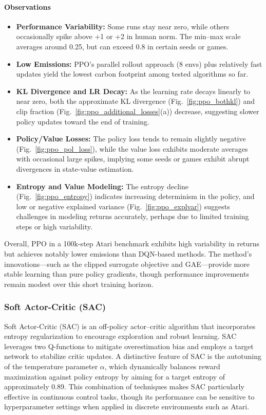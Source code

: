 \paragraph{Observations}
\begin{itemize}
	\item \textbf{Performance Variability:} 
	Some runs stay near zero, while others occasionally spike above +1 or +2 in human norm. 
	The min--max scale averages around 0.25, but can exceed 0.8 in certain seeds or games.
	\item \textbf{Low Emissions:} 
	PPO's parallel rollout approach (8 envs) plus relatively fast updates 
	yield the lowest carbon footprint among tested algorithms so far.
	\item \textbf{KL Divergence and LR Decay:} As the learning rate decays linearly to near zero, both the approximate KL divergence (Fig.~\ref{fig:ppo_bothkl}) and clip fraction (Fig.~\ref{fig:ppo_additional_losses}(a)) decrease, suggesting slower policy updates toward the end of training.
	\item \textbf{Policy/Value Losses:} The policy loss tends to remain slightly negative (Fig.~\ref{fig:ppo_pol_loss}), while the value loss exhibits moderate averages with occasional large spikes, implying some seeds or games exhibit abrupt divergences in state-value estimation.
	\item \textbf{Entropy and Value Modeling:} The entropy decline (Fig.~\ref{fig:ppo_entropy}) indicates increasing determinism in the policy, and low or negative explained variance (Fig.~\ref{fig:ppo_explvar}) suggests challenges in modeling returns accurately, perhaps due to limited training steps or high variability.
\end{itemize}

Overall, PPO in a 100k-step Atari benchmark exhibits high variability in returns but achieves notably lower emissions than DQN-based methods. The method's innovations—such as the clipped surrogate objective and GAE—provide more stable learning than pure policy gradients, though performance improvements remain modest over this short training horizon.

\subsubsection{Soft Actor-Critic (SAC)}
\label{subsubsec:sac}

Soft Actor-Critic (SAC) is an off-policy actor–critic algorithm that incorporates entropy regularization to encourage exploration and robust learning. SAC leverages two Q-functions to mitigate overestimation bias and employs a target network to stabilize critic updates. A distinctive feature of SAC is the autotuning of the temperature parameter $\alpha$, which dynamically balances reward maximization against policy entropy by aiming for a target entropy of approximately 0.89. This combination of techniques makes SAC particularly effective in continuous control tasks, though its performance can be sensitive to hyperparameter settings when applied in discrete environments such as Atari.

